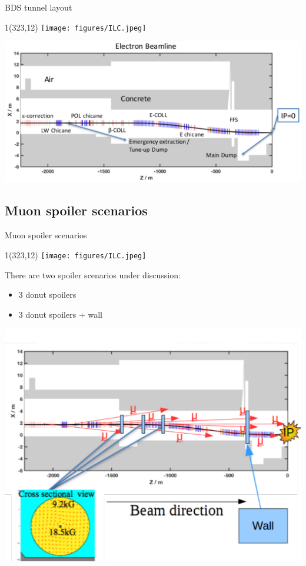 \documentclass[xcolor={dvipsnames}]{beamer}
\newcommand{\ilclogo}{
  \setlength{\TPHorizModule}{1pt}
  \setlength{\TPVertModule}{1pt}
  \begin{textblock}{1}(323,12)
   \texttt{[image: figures/ILC.jpeg]}
  \end{textblock}
}
\begin{document}
\begin{frame}{BDS tunnel layout}
\ilclogo
\begin{center}
\includegraphics[height=0.65\textheight]{BDS_electron_tunnel.pdf}
\end{center}
\end{frame}

\subsection{Muon spoiler scenarios}
\begin{frame}{Muon spoiler scenarios}
\ilclogo
There are two spoiler scenarios under discussion:
\begin{itemize}
 \item 3 donut spoilers
 \item 3 donut spoilers + wall
\end{itemize}
\begin{center}
\includegraphics[height=0.7\textheight]{Muon_spoiler_scenarios.pdf}
\end{center}
\end{frame}
\end{document}
